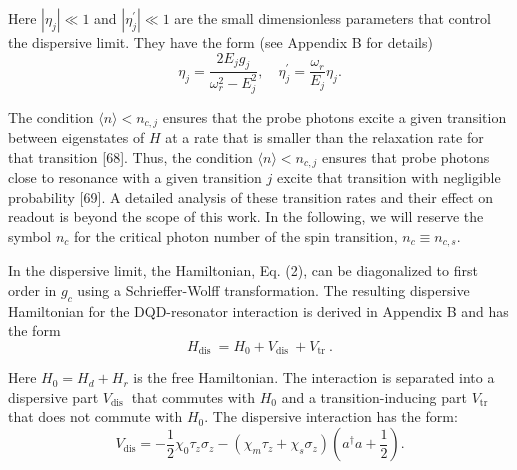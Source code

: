 \documentclass[12pt]{article}
\begin{document}
Here $\left|\eta_j\right| \ll 1$ and $\left|\eta_j^{\prime}\right| \ll 1$ are the small dimensionless parameters that control the dispersive limit. They have the form (see Appendix B for details)
$$
\eta_j=\frac{2 E_j g_j}{\omega_r^2-E_j^2}, \quad \eta_j^{\prime}=\frac{\omega_r}{E_j} \eta_j .
$$

The condition $\langle n\rangle<n_{c, j}$ ensures that the probe photons excite a given transition between eigenstates of $H$ at a rate that is smaller than the relaxation rate for that transition [68]. Thus, the condition $\langle n\rangle<n_{c, j}$ ensures that probe photons close to resonance with a given transition $j$ excite that transition with negligible probability [69]. A detailed analysis of these transition rates and their effect on readout is beyond the scope of this work. In the following, we will reserve the symbol $n_c$ for the critical photon number of the spin transition, $n_c \equiv n_{c, s}$.

In the dispersive limit, the Hamiltonian, Eq. (2), can be diagonalized to first order in $g_c$ using a Schrieffer-Wolff
transformation. The resulting dispersive Hamiltonian for the DQD-resonator interaction is derived in Appendix B and has the form
$$
H_{\text {dis }}=H_0+V_{\text {dis }}+V_{\text {tr }} .
$$

Here $H_0=H_d+H_r$ is the free Hamiltonian. The interaction is separated into a dispersive part $V_{\text {dis }}$ that commutes with $H_0$ and a transition-inducing part $V_{\mathrm{tr}}$ that does not commute with $H_0$. The dispersive interaction has the form:
$$
V_{\mathrm{dis}}=-\frac{1}{2} \chi_0 \tau_z \sigma_z-\left(\chi_m \tau_z+\chi_s \sigma_z\right)\left(a^{\dagger} a+\frac{1}{2}\right) .
$$
\end{document}
